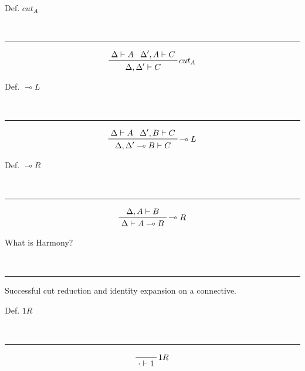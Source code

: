 \begin{note}
  \begin{field}
    Def. $cut_A$
  \end{field} \\
  \noindent\rule[0.5ex]{\linewidth}{1pt}
  \begin{field}
    \[ 
      \prftree[r]
      {$cut_A$}
      {\Delta\vdash A}
      {\Delta',A\vdash C}
      {\Delta,\Delta'\vdash C}
    \] 
  \end{field}
\end{note}

\begin{note}
  \begin{field}
    Def. $\multimap L$
  \end{field} \\
  \noindent\rule[0.5ex]{\linewidth}{1pt}
  \begin{field}
    \[
      \prftree[r]
      {$\multimap L$}
      {\Delta\vdash A}
      {\Delta', B\vdash C}
      {\Delta, \Delta'\multimap B\vdash C}
    \]
  \end{field}
\end{note}

\begin{note}
  \begin{field}
    Def. $\multimap R$
  \end{field} \\
  \noindent\rule[0.5ex]{\linewidth}{1pt}
  \begin{field}
    \[ 
      \prftree[r]
      {$\multimap R$}
      {\Delta, A\vdash B}
      {\Delta\vdash A\multimap B}
    \] 
  \end{field}
\end{note}


\begin{note}
  \begin{field}
    What is Harmony?
  \end{field} \\
  \noindent\rule[0.5ex]{\linewidth}{1pt}
  \begin{field}
    Successful cut reduction and identity expansion on a connective.
  \end{field}
\end{note}

\begin{note}
  \begin{field}
    Def. $1 R$
  \end{field} \\
  \noindent\rule[0.5ex]{\linewidth}{1pt}
  \begin{field}
    \[ 
      \prftree[r]
      {$1 R$}
      {\cdot\vdash 1}
    \] 
  \end{field}
\end{note}

